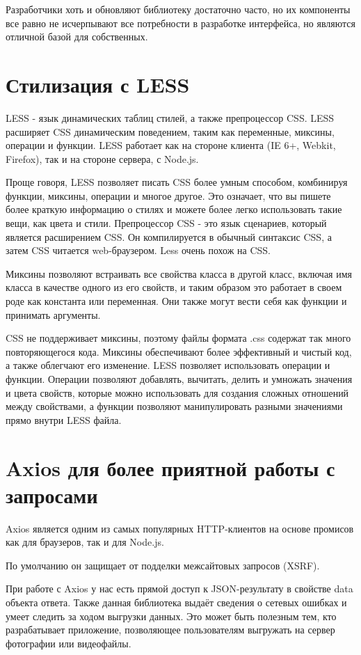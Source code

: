 \documentclass[12pt, a4paper]{diplom}
\begin{document}
Разработчики хоть и обновляют библиотеку достаточно часто, но их компоненты все равно не исчерпывают все потребности в разработке интерфейса,
но являются отличной базой для собственных.

\section{Стилизация с LESS}

LESS\cite{Less} - язык динамических таблиц стилей, а также препроцессор CSS.
LESS расширяет CSS динамическим поведением, таким как переменные, миксины, операции и функции. LESS работает как на стороне клиента (IE 6+, Webkit, Firefox), так и на стороне сервера, с Node.js.

Проще говоря, LESS позволяет писать CSS более умным способом, комбинируя функции, миксины, операции и многое другое. Это означает, что вы пишете более краткую информацию о стилях и можете более легко использовать такие вещи, как цвета и стили.
Препроцессор CSS - это язык сценариев, который является расширением CSS. Он компилируется в обычный синтаксис CSS, а затем CSS читается web-браузером. Less очень похож на CSS.

Миксины позволяют встраивать все свойства класса в другой класс, включая имя класса в качестве одного из его свойств, и таким образом это работает в своем роде как константа или переменная. Они также могут вести себя как функции и принимать аргументы. 

CSS не поддерживает миксины, поэтому файлы формата .css содержат так много повторяющегося кода. Миксины обеспечивают более эффективный и чистый код, а также облегчают его изменение.
LESS позволяет использовать операции и функции. Операции позволяют добавлять, вычитать, делить и умножать значения и цвета свойств, которые можно использовать для создания сложных отношений между свойствами, а функции позволяют манипулировать разными значениями прямо внутри LESS файла.

\section{Axios для более приятной работы с запросами}

Axios\cite{Axios} является одним из самых популярных HTTP-клиентов на основе промисов как для браузеров, так и для Node.js.

По умолчанию он защищает от подделки межсайтовых запросов (XSRF).

При работе с Axios у нас есть прямой доступ к JSON-результату в свойстве data объекта ответа.
Также данная библиотека выдаёт сведения о сетевых ошибках и умеет следить за ходом выгрузки данных. Это может быть полезным тем, кто разрабатывает приложение, позволяющее пользователям выгружать на сервер фотографии или видеофайлы.
\end{document}
